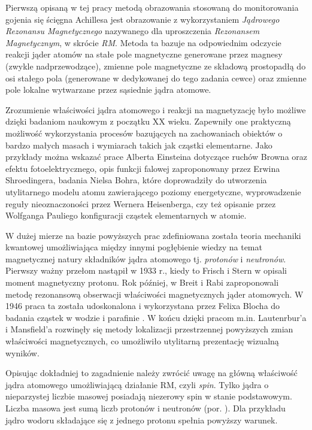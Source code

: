Pierwszą opisaną w tej pracy metodą obrazowania stosowaną do monitorowania gojenia się ścięgna Achillesa jest obrazowanie z wykorzystaniem \textit{Jądrowego Rezonansu Magnetycznego} nazywanego dla uproszczenia \textit{Rezonansem Magnetycznym}, w skrócie \textit{RM}. Metoda ta bazuje na odpowiednim odczycie reakcji jąder atomów na stałe pole magnetyczne generowane przez magnesy (zwykle nadprzewodzące), zmienne pole magnetyczne ze składową prostopadłą do osi stałego pola (generowane w dedykowanej do tego zadania cewce) oraz zmienne pole lokalne wytwarzane przez sąsiednie jądra atomowe.

Zrozumienie właściwości jądra atomowego i reakcji na magnetyzację było możliwe dzięki badaniom naukowym z początku XX wieku. Zapewniły one praktyczną możliwość wykorzystania procesów bazujących na zachowaniach obiektów o bardzo małych masach i wymiarach takich jak cząstki elementarne. Jako przykłady można wskazać prace Alberta Einsteina dotyczące ruchów Browna oraz efektu fotoelektrycznego, opis funkcji falowej zaproponowany przez Erwina Shroedingera, badania Nielsa Bohra, które doprowadziły do utworzenia utylitarnego modelu atomu zawierającego poziomy energetyczne, wyprowadzenie reguły nieoznaczoności przez Wernera Heisenberga, czy też opisanie przez Wolfganga Pauliego konfiguracji cząstek elementarnych w atomie. 

W dużej mierze na bazie powyższych prac zdefiniowana została teoria mechaniki kwantowej umożliwiająca między innymi pogłębienie wiedzy na temat magnetycznej natury składników jądra atomowego tj. \textit{protonów} i \textit{neutronów}. Pierwszy ważny przełom nastąpił w 1933 r., kiedy to Frisch i Stern w \cite{Frisch1933} opisali moment magnetyczny protonu. Rok później, w \cite{Breit1934} Breit i Rabi zaproponowali metodę rezonansową obserwacji właściwości magnetycznych jąder atomowych. W 1946 praca ta została udoskonalona i wykorzystana przez Felixa Blocha do badania cząstek w wodzie \linebreak i parafinie \cite{Bloch1946}. W końcu dzięki pracom m.in. Lautenrbur'a \cite{LAUTERBUR1973} i Mansfield'a \cite{Mansfield1977} rozwinęły się metody lokalizacji przestrzennej powyższych zmian właściwości magnetycznych, co umożliwiło utylitarną prezentację wizualną wyników. 

Opisując dokładniej to zagadnienie należy zwrócić uwagę na główną właściwość jądra atomowego umożliwiającą działanie RM, czyli \textit{spin}. Tylko jądra o nieparzystej liczbie masowej posiadają niezerowy spin w stanie podstawowym. Liczba masowa jest sumą liczb protonów i neutronów (por. \cite{RM2015}). Dla przykładu jądro wodoru składające się z jednego protonu spełnia powyższy warunek. 

